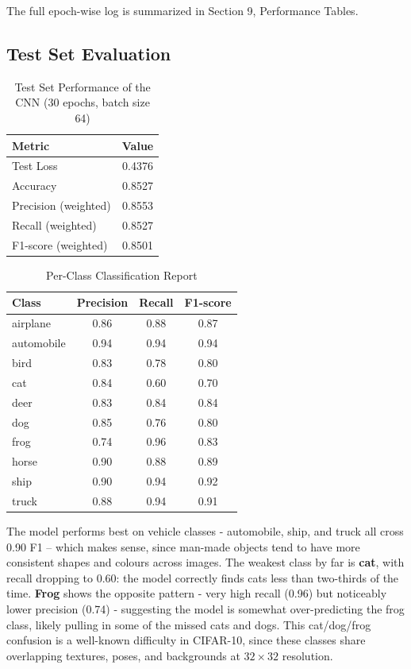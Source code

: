 \documentclass[11pt]{article}
\begin{document}
The full epoch-wise log is summarized in Section 9, Performance Tables.

\subsection*{Test Set Evaluation}

\begin{table}[H]
\centering
\caption{Test Set Performance of the CNN (30 epochs, batch size 64)}
\begin{tabular}{lc}
\toprule
Metric & Value \\
\midrule
Test Loss & 0.4376 \\
Accuracy & 0.8527 \\
Precision (weighted) & 0.8553 \\
Recall (weighted) & 0.8527 \\
F1-score (weighted) & 0.8501 \\
\bottomrule
\end{tabular}
\end{table}

\begin{table}[H]
\centering
\caption{Per-Class Classification Report}
\begin{tabular}{lccc}
\toprule
Class & Precision & Recall & F1-score \\
\midrule
airplane   & 0.86 & 0.88 & 0.87 \\
automobile & 0.94 & 0.94 & 0.94 \\
bird       & 0.83 & 0.78 & 0.80 \\
cat        & 0.84 & 0.60 & 0.70 \\
deer       & 0.83 & 0.84 & 0.84 \\
dog        & 0.85 & 0.76 & 0.80 \\
frog       & 0.74 & 0.96 & 0.83 \\
horse      & 0.90 & 0.88 & 0.89 \\
ship       & 0.90 & 0.94 & 0.92 \\
truck      & 0.88 & 0.94 & 0.91 \\
\bottomrule
\end{tabular}
\end{table}

The model performs best on vehicle classes - automobile, ship, and truck all cross 0.90 F1 -- which makes sense, since man-made objects tend to have more consistent shapes and colours across images. The weakest class by far is \textbf{cat}, with recall dropping to 0.60: the model correctly finds cats less than two-thirds of the time. \textbf{Frog} shows the opposite pattern - very high recall (0.96) but noticeably lower precision (0.74) - suggesting the model is somewhat over-predicting the frog class, likely pulling in some of the missed cats and dogs. This cat/dog/frog confusion is a well-known difficulty in CIFAR-10, since these classes share overlapping textures, poses, and backgrounds at $32\times32$ resolution.
\end{document}
